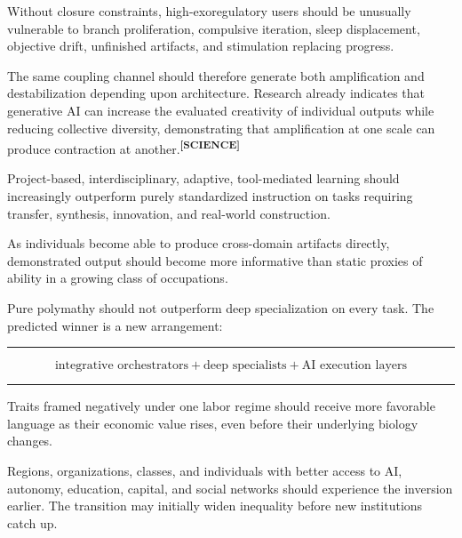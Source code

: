 \documentclass[10pt]{article}
\newcommand{\ActiveAccent}{Industrial}
\newcommand{\subhead}[1]{\Needspace{4\baselineskip}\vspace{0.5em}{\sffamily\bfseries\fontsize{10.5}{13}\selectfont\textcolor{\ActiveAccent}{#1}}\par\vspace{-0.1em}}
\newcommand{\sourcecue}[1]{\textsuperscript{\sffamily\bfseries\fontsize{6.5}{7}\selectfont\textcolor{\ActiveAccent}{[#1]}}}
\newenvironment{equationpanel}{\begin{center}\begin{minipage}{0.92\linewidth}\color{\ActiveAccent}\rule{\linewidth}{0.55pt}\par\vspace{-0.25em}\color{Ink}}{\vspace{-0.10em}\par\color{\ActiveAccent}\rule{\linewidth}{0.55pt}\end{minipage}\end{center}}
\begin{document}
Without closure constraints, high-exoregulatory users should be unusually vulnerable to branch proliferation, compulsive iteration, sleep displacement, objective drift, unfinished artifacts, and stimulation replacing progress.

The same coupling channel should therefore generate both amplification and destabilization depending upon architecture. Research already indicates that generative AI can increase the evaluated creativity of individual outputs while reducing collective diversity, demonstrating that amplification at one scale can produce contraction at another.\sourcecue{SCIENCE}

\subhead{4. Educational advantage should migrate}

Project-based, interdisciplinary, adaptive, tool-mediated learning should increasingly outperform purely standardized instruction on tasks requiring transfer, synthesis, innovation, and real-world construction.

\subhead{5. Portfolios should gain relative power over credentials}

As individuals become able to produce cross-domain artifacts directly, demonstrated output should become more informative than static proxies of ability in a growing class of occupations.

\subhead{6. The specialist does not disappear}

Pure polymathy should not outperform deep specialization on every task. The predicted winner is a new arrangement:

\begin{equationpanel}
\begin{equation*}
\text{integrative orchestrators}+\text{deep specialists}+\text{AI execution layers}
\end{equation*}
\end{equationpanel}

\subhead{7. Social pathology labels should shift with economic demand}

Traits framed negatively under one labor regime should receive more favorable language as their economic value rises, even before their underlying biology changes.

\subhead{8. The phase transition should be uneven}

Regions, organizations, classes, and individuals with better access to AI, autonomy, education, capital, and social networks should experience the inversion earlier. The transition may initially widen inequality before new institutions catch up.
\end{document}
